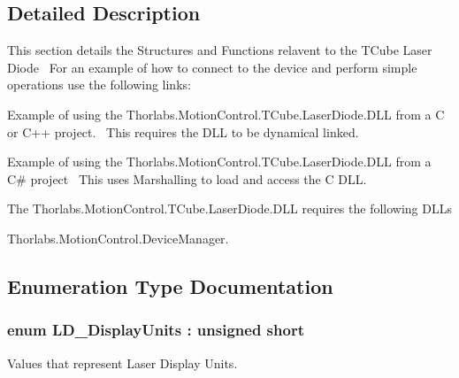 \subsection{Detailed Description}
This section details the Structures and Functions relavent to the T\+Cube Laser Diode~\newline
 For an example of how to connect to the device and perform simple operations use the following links\+: 
\begin{DoxyItemize}
\item Example of using the Thorlabs.Motion\+Control.T\+Cube.Laser\+Diode.D\+LL from a C or C++ project.~\newline
 This requires the D\+LL to be dynamical linked.  
\item Example of using the Thorlabs.Motion\+Control.T\+Cube.Laser\+Diode.D\+LL from a C\# project~\newline
 This uses Marshalling to load and access the C D\+LL.  
\end{DoxyItemize}The Thorlabs.\+Motion\+Control.\+T\+Cube.\+Laser\+Diode.\+D\+LL requires the following D\+L\+Ls 
\begin{DoxyItemize}
\item Thorlabs.\+Motion\+Control.\+Device\+Manager.  
\end{DoxyItemize}

\subsection{Enumeration Type Documentation}
\subsubsection[{\texorpdfstring{L\+D\+\_\+\+Display\+Units}{LD_DisplayUnits}}]{\setlength{\rightskip}{0pt plus 5cm}enum {\bf L\+D\+\_\+\+Display\+Units} \+: unsigned short}\hypertarget{group___t_cube_laser_diode_ga08addc78430e6c04fb1441655e98a67d}{}\label{group___t_cube_laser_diode_ga08addc78430e6c04fb1441655e98a67d}


Values that represent Laser Display Units. 

